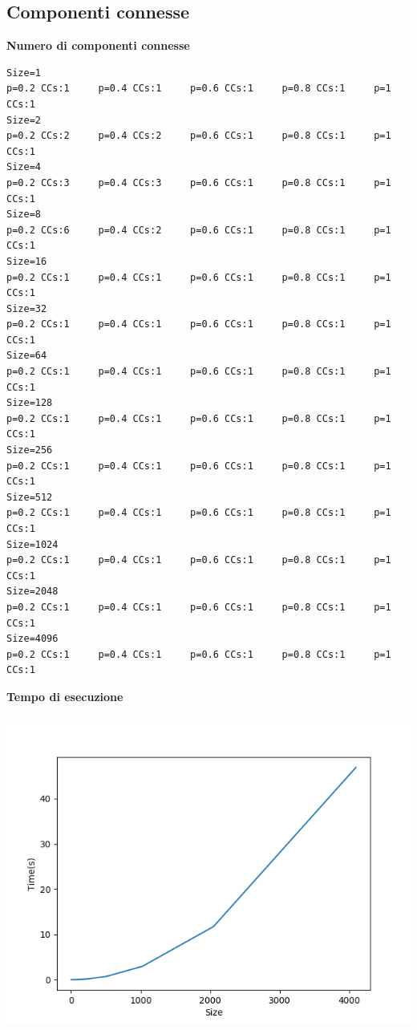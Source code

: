 \documentclass[]{article}
\begin{document}
\subsection{Componenti connesse}
\textbf{Numero di componenti connesse}
\begin{verbatim}
Size=1
p=0.2 CCs:1	    p=0.4 CCs:1	    p=0.6 CCs:1	    p=0.8 CCs:1	    p=1  CCs:1
Size=2 
p=0.2 CCs:2     p=0.4 CCs:2	    p=0.6 CCs:1     p=0.8 CCs:1     p=1  CCs:1 
Size=4
p=0.2 CCs:3     p=0.4 CCs:3     p=0.6 CCs:1     p=0.8 CCs:1	    p=1  CCs:1 
Size=8
p=0.2 CCs:6     p=0.4 CCs:2	    p=0.6 CCs:1	    p=0.8 CCs:1     p=1  CCs:1 
Size=16
p=0.2 CCs:1     p=0.4 CCs:1	    p=0.6 CCs:1	    p=0.8 CCs:1	    p=1  CCs:1
Size=32
p=0.2 CCs:1	    p=0.4 CCs:1     p=0.6 CCs:1	    p=0.8 CCs:1	    p=1  CCs:1
Size=64
p=0.2 CCs:1	    p=0.4 CCs:1     p=0.6 CCs:1     p=0.8 CCs:1     p=1  CCs:1 
Size=128
p=0.2 CCs:1	    p=0.4 CCs:1	    p=0.6 CCs:1	    p=0.8 CCs:1	    p=1  CCs:1
Size=256
p=0.2 CCs:1	    p=0.4 CCs:1	    p=0.6 CCs:1	    p=0.8 CCs:1	    p=1  CCs:1
Size=512
p=0.2 CCs:1	    p=0.4 CCs:1	    p=0.6 CCs:1	    p=0.8 CCs:1	    p=1  CCs:1
Size=1024
p=0.2 CCs:1	    p=0.4 CCs:1	    p=0.6 CCs:1	    p=0.8 CCs:1	    p=1  CCs:1
Size=2048
p=0.2 CCs:1	    p=0.4 CCs:1	    p=0.6 CCs:1     p=0.8 CCs:1	    p=1  CCs:1
Size=4096
p=0.2 CCs:1	    p=0.4 CCs:1     p=0.6 CCs:1	    p=0.8 CCs:1	    p=1  CCs:1
\end{verbatim}
\textbf{Tempo di esecuzione}\\\\
\includegraphics[scale=0.5]{cc_time_p=02.png}
\end{document}
